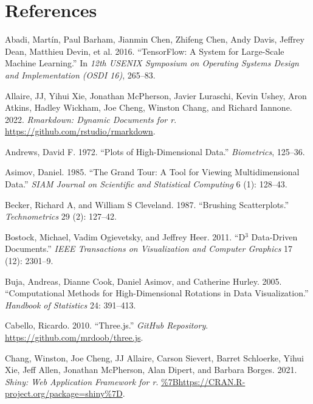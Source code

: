 \hypertarget{references}{%
\section*{References}\label{references}}

\hypertarget{refs}{}
\begin{CSLReferences}{1}{0}
\leavevmode{}%
Abadi, Martín, Paul Barham, Jianmin Chen, Zhifeng Chen, Andy Davis, Jeffrey Dean, Matthieu Devin, et al. 2016. {``TensorFlow: A System for Large-Scale Machine Learning.''} In \emph{12th USENIX Symposium on Operating Systems Design and Implementation (OSDI 16)}, 265--83.

\leavevmode{}%
Allaire, JJ, Yihui Xie, Jonathan McPherson, Javier Luraschi, Kevin Ushey, Aron Atkins, Hadley Wickham, Joe Cheng, Winston Chang, and Richard Iannone. 2022. \emph{Rmarkdown: Dynamic Documents for r}. \url{https://github.com/rstudio/rmarkdown}.

\leavevmode{}%
Andrews, David F. 1972. {``Plots of High-Dimensional Data.''} \emph{Biometrics}, 125--36.

\leavevmode{}%
Asimov, Daniel. 1985. {``The Grand Tour: A Tool for Viewing Multidimensional Data.''} \emph{SIAM Journal on Scientific and Statistical Computing} 6 (1): 128--43.

\leavevmode{}%
Becker, Richard A, and William S Cleveland. 1987. {``Brushing Scatterplots.''} \emph{Technometrics} 29 (2): 127--42.

\leavevmode{}%
Bostock, Michael, Vadim Ogievetsky, and Jeffrey Heer. 2011. {``D\(^3\) Data-Driven Documents.''} \emph{IEEE Transactions on Visualization and Computer Graphics} 17 (12): 2301--9.

\leavevmode{}%
Buja, Andreas, Dianne Cook, Daniel Asimov, and Catherine Hurley. 2005. {``Computational Methods for High-Dimensional Rotations in Data Visualization.''} \emph{Handbook of Statistics} 24: 391--413.

\leavevmode{}%
Cabello, Ricardo. 2010. {``Three.js.''} \emph{GitHub Repository}. \url{https://github.com/mrdoob/three.js}.

\leavevmode{}%
Chang, Winston, Joe Cheng, JJ Allaire, Carson Sievert, Barret Schloerke, Yihui Xie, Jeff Allen, Jonathan McPherson, Alan Dipert, and Barbara Borges. 2021. \emph{Shiny: Web Application Framework for r}. \url{\%7Bhttps://CRAN.R-project.org/package=shiny\%7D}.


\end{CSLReferences}
